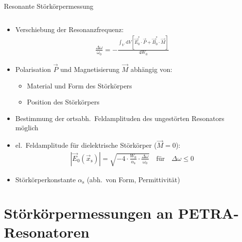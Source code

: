 \documentclass[12pt,xcolor=dvipsnames,professionalfonts]{beamer}
\begin{document}
\begin{frame}{Resonante Störkörpermessung}
\begin{columns}[c,onlytextwidth]
	\end{columns}

\end{frame}

\begin{frame}
	\begin{itemize}
		\setlength\itemsep{1.25em}
		\item Verschiebung der Resonanzfrequenz:
		\begin{align*}
			\frac{\Delta \omega}{\omega_0} = -\frac{\int_{V} \, \mathrm{d}V \left[ \vec{E}_0^* \cdot \vec{P} + \vec{B}_0^* \cdot \vec{M} \right]}{4 W_0}
		\end{align*}
	
	\item Polarisation $\vec{P}$ und Magnetisierung $\vec{M}$ abhängig von:
		\begin{itemize}
			\setlength\itemsep{0.25em}
			\item Material und Form des Störkörpers
			\item Position des Störkörpers
		\end{itemize}
	\item Bestimmung der ortsabh.\ Feldamplituden des ungestörten Resonators möglich	
	\end{itemize}
\end{frame}

\begin{frame}
	\begin{itemize}
		\setlength\itemsep{1.25em}
		\item el.\ Feldamplitude für dielektrische Störkörper ($\vec{M} = 0$):
		\begin{align*}
			|\vec{E}_0(\vec{x}_\mathrm{s})| = \sqrt{- 4 \cdot \frac{W_0}{\alpha_\mathrm{s}} \cdot \frac{\Delta \omega}{\omega_0}} \quad \text{für} \quad \Delta \omega \leq 0
		\end{align*}
		
		\item Störkörperkonstante $\alpha_\mathrm{s}$ (abh.\ von Form, Permittivität)
	\end{itemize}
\end{frame}

\section{Störkörpermessungen an PETRA-Resonatoren}
\end{document}
